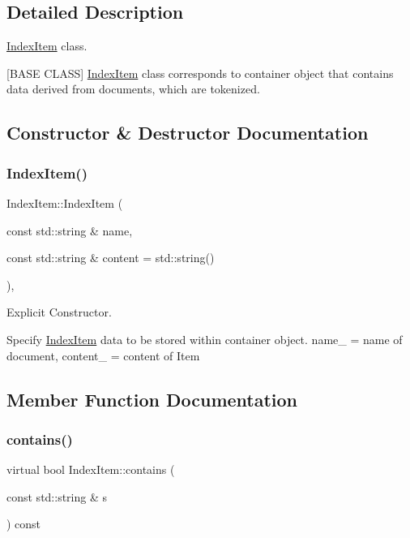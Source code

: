 \subsection{Detailed Description}
\hyperlink{class_index_item}{Index\+Item} class. 

\mbox{[}B\+A\+SE C\+L\+A\+SS\mbox{]} \hyperlink{class_index_item}{Index\+Item} class corresponds to container object that contains data derived from documents, which are tokenized. 

\subsection{Constructor \& Destructor Documentation}
\mbox{\label{class_index_item_a9fcaaa46fb93a873ad73dc1ebdec8163}} 
\subsubsection{\texorpdfstring{Index\+Item()}{IndexItem()}}
{\footnotesize\ttfamily Index\+Item\+::\+Index\+Item (\begin{DoxyParamCaption}\item[{const std\+::string \&}]{name,  }\item[{const std\+::string \&}]{content = {\ttfamily std\+:\+:string()} }\end{DoxyParamCaption})\hspace{0.3cm}{\ttfamily [inline]}, {\ttfamily [explicit]}}



Explicit Constructor. 

Specify \hyperlink{class_index_item}{Index\+Item} data to be stored within container object. name\+\_\+ = name of document, content\+\_\+ = content of Item 

\subsection{Member Function Documentation}
\mbox{\label{class_index_item_a534d96bf041a485ed124663b9cded2fb}} 
\subsubsection{\texorpdfstring{contains()}{contains()}}
{\footnotesize\ttfamily virtual bool Index\+Item\+::contains (\begin{DoxyParamCaption}\item[{const std\+::string \&}]{s }\end{DoxyParamCaption}) const\hspace{0.3cm}{\ttfamily [pure virtual]}}



